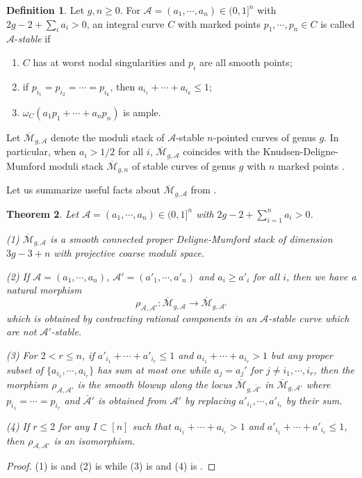 \documentclass[11pt]{amsart}
\numberwithin{equation}{section}
\newtheorem{theo}{Theorem}[section]
\theoremstyle{definition}
\newtheorem{defi}[theo]{Definition}
\def\cA{{\mathcal A}}
\def\cM{{\mathcal M}}
\def\lra{\longrightarrow }
\def\beq{\begin{equation}}
\def\eeq{\end{equation}}
\def\bcM{\overline{\cM}}
\begin{document}
\begin{defi} \cite{Hst}
Let $g, n\ge 0$. For $\cA=(a_1,\cdots,a_n)\in (0,1]^n$ with $2g-2+\sum_i a_i>0$, an integral curve $C$ with marked points $p_1, \cdots,p_n\in C$ is called $\cA$-\emph{stable} if \begin{enumerate}
\item $C$ has at worst nodal singularities and $p_i$ are all smooth points;
\item if $p_{i_1}=p_{i_2}=\cdots=p_{i_k}$, then $a_{i_1}+\cdots+a_{i_k}\le 1$;
\item $\omega_C(a_1p_1+\cdots +a_np_n)$ is ample. 
\end{enumerate}
\end{defi}
Let $\bcM_{g,\cA}$ denote the moduli stack of $\cA$-stable $n$-pointed curves of genus $g$. 
In particular, when $a_i>1/2$ for all $i$, $\bcM_{g,\cA}$ coincides with the Knudsen-Deligne-Mumford moduli stack $\bcM_{g,n}$ of stable curves of genus $g$ with $n$ marked points \cite{DM,Knu}.

\medskip

Let us summarize useful facts about $\bcM_{g,\cA}$ from \cite{Hst}.
\begin{theo}\label{2} 
Let $\cA=(a_1,\cdots,a_n)\in (0,1]^n$ with $2g-2+\sum_{i=1}^n a_i>0$.

(1) $\bcM_{g,\cA}$ is a smooth connected proper Deligne-Mumford stack of dimension $3g-3+n$ with projective coarse moduli space.  

(2) If $\cA=(a_1,\cdots,a_n)$, $\cA'=(a'_1,\cdots, a'_n)$ and $a_i\ge a'_i$ for all $i$, then we have a natural morphism 
\beq\label{1} \rho_{\cA,\cA'}:\bcM_{g,\cA}\lra \bcM_{g,\cA'}\eeq 
which is obtained by contracting rational components in an $\cA$-stable curve which are not $\cA'$-stable. 

(3) For $2<r\le n$, if $a'_{i_1}+\cdots+a'_{i_r}\le 1$  and $a_{i_1}+\cdots+a_{i_r}>1$ but any proper subset  of $\{a_{i_1},\cdots, a_{i_r}\}$ has sum at most one while $a_j=a_j'$ for $j\ne i_1,\cdots,i_r$, then the morphism $\rho_{\cA,\cA'}$ is the smooth blowup along the locus $\bcM_{g,\bar \cA'}$ in $\bcM_{g,\cA'}$ where $p_{i_1}=\cdots=p_{i_r}$ and $\bar \cA'$ is obtained from $\cA'$ by replacing $a'_{i_1}, \cdots, a'_{i_r}$ by their sum. 

(4) If $r\le 2$ for any $I\subset [n]$ such that $a_{i_1}+\cdots+a_{i_r}>1$ and $a'_{i_1}+\cdots+a'_{i_r}\le 1$, then $\rho_{\cA,\cA'}$ is an isomorphism. 
\end{theo}
\begin{proof}
    (1) is \cite[Theorem 2.1]{Hst} and (2) is \cite[Theorem 4.1]{Hst} while (3) is \cite[Remark 4.6]{Hst} and (4) is \cite[Corollary 4.7]{Hst}. 
\end{proof}
\end{document}
